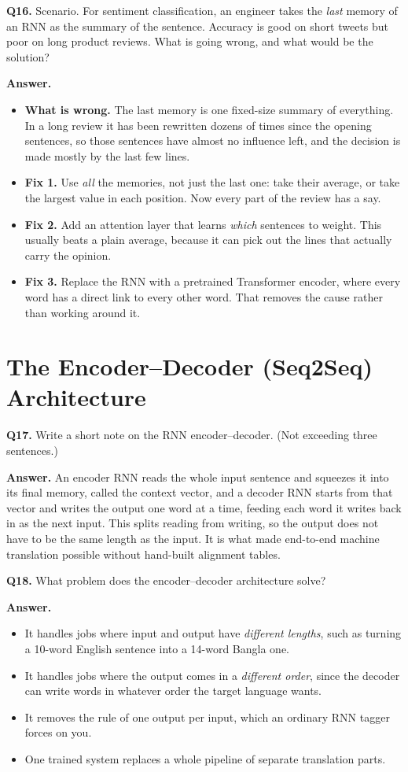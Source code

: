 \documentclass[11pt]{article}
\begin{document}
\medskip
\textbf{Q16.} Scenario. For sentiment classification, an engineer takes the \emph{last} memory
of an RNN as the summary of the sentence. Accuracy is good on short tweets but poor on long
product reviews. What is going wrong, and what would be the solution?

\textbf{Answer.}
\begin{itemize}
  \item \textbf{What is wrong.} The last memory is one fixed-size summary of everything. In a long review it has been rewritten dozens of times since the opening sentences, so those sentences have almost no influence left, and the decision is made mostly by the last few lines.
  \item \textbf{Fix 1.} Use \emph{all} the memories, not just the last one: take their average, or take the largest value in each position. Now every part of the review has a say.
  \item \textbf{Fix 2.} Add an attention layer that learns \emph{which} sentences to weight. This usually beats a plain average, because it can pick out the lines that actually carry the opinion.
  \item \textbf{Fix 3.} Replace the RNN with a pretrained Transformer encoder, where every word has a direct link to every other word. That removes the cause rather than working around it.
\end{itemize}

\section{The Encoder--Decoder (Seq2Seq) Architecture}

\textbf{Q17.} Write a short note on the RNN encoder--decoder. (Not exceeding three sentences.)

\textbf{Answer.} An encoder RNN reads the whole input sentence and squeezes it into its final
memory, called the context vector, and a decoder RNN starts from that vector and writes the
output one word at a time, feeding each word it writes back in as the next input. This splits
reading from writing, so the output does not have to be the same length as the input. It is
what made end-to-end machine translation possible without hand-built alignment tables.

\medskip
\textbf{Q18.} What problem does the encoder--decoder architecture solve?

\textbf{Answer.}
\begin{itemize}
  \item It handles jobs where input and output have \emph{different lengths}, such as turning a 10-word English sentence into a 14-word Bangla one.
  \item It handles jobs where the output comes in a \emph{different order}, since the decoder can write words in whatever order the target language wants.
  \item It removes the rule of one output per input, which an ordinary RNN tagger forces on you.
  \item One trained system replaces a whole pipeline of separate translation parts.
\end{itemize}
\end{document}
